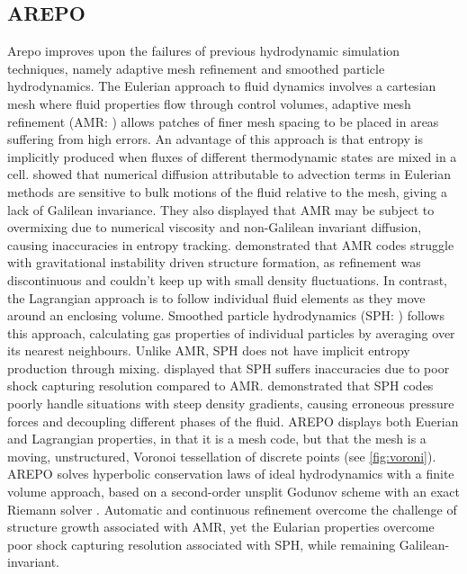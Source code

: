 \documentclass[11pt]{article}
\begin{document}
\subsection{AREPO}
\label{sub:arepo}
Arepo improves upon the failures of previous hydrodynamic simulation techniques, namely adaptive mesh refinement and smoothed particle hydrodynamics. The Eulerian approach to fluid dynamics involves a cartesian mesh where fluid properties flow through control volumes, adaptive mesh refinement (AMR: \citealt{Berger1989}) allows patches of finer mesh spacing to be placed in areas suffering from high errors. An advantage of this approach is that entropy is implicitly produced when fluxes of different thermodynamic states are mixed in a cell. \cite{Wadsley2008} showed that numerical diffusion attributable to advection terms in Eulerian methods are sensitive to bulk motions of the fluid relative to the mesh, giving a lack of Galilean invariance. They also displayed that AMR may be subject to overmixing due to numerical viscosity and non-Galilean invariant diffusion, causing inaccuracies in entropy tracking. \cite{Heitmann2008} demonstrated that AMR codes struggle with gravitational instability driven structure formation, as refinement was discontinuous and couldn’t keep up with small density fluctuations. In contrast, the Lagrangian approach is to follow individual fluid elements as they move around an enclosing volume. Smoothed particle hydrodynamics (SPH: \citealt{Monaghan1992}) follows this approach, calculating gas properties of individual particles by averaging over its nearest neighbours. Unlike AMR, SPH does not have implicit entropy production through mixing. \cite{Moore2000} displayed that SPH suffers inaccuracies due to poor shock capturing resolution compared to AMR. \cite{Agertz2007} demonstrated that SPH codes poorly handle situations with steep density gradients, causing erroneous pressure forces and decoupling different phases of the fluid. AREPO displays both Euerian and Lagrangian properties, in that it is a mesh code, but that the mesh is a moving, unstructured, Voronoi tessellation of discrete points (see \autoref{fig:voroni}). AREPO solves hyperbolic conservation laws of ideal hydrodynamics with a finite volume approach, based on a second-order unsplit Godunov scheme with an exact Riemann solver \citep{Springel2010}. Automatic and continuous refinement overcome the challenge of structure growth associated with AMR, yet the Eularian properties overcome poor shock capturing resolution associated with SPH, while remaining Galilean-invariant. 
\end{document}
